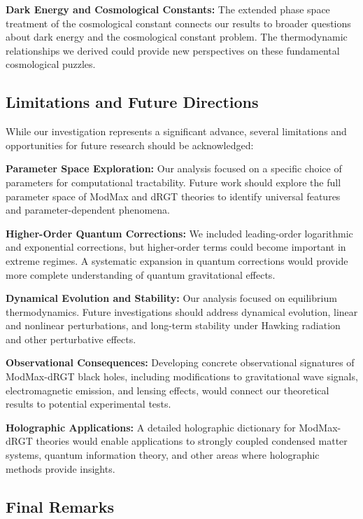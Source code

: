 \documentclass[superscriptaddress, prd, aps,amsmath,amssymb,showpacs,showkeys, onecolumn]{revtex4-2}
\begin{document}
\textbf{Dark Energy and Cosmological Constants:} The extended phase space treatment of the cosmological constant connects our results to broader questions about dark energy and the cosmological constant problem. The thermodynamic relationships we derived could provide new perspectives on these fundamental cosmological puzzles.

\subsection{Limitations and Future Directions}

While our investigation represents a significant advance, several limitations and opportunities for future research should be acknowledged:

\textbf{Parameter Space Exploration:} Our analysis focused on a specific choice of parameters for computational tractability. Future work should explore the full parameter space of ModMax and dRGT theories to identify universal features and parameter-dependent phenomena.

\textbf{Higher-Order Quantum Corrections:} We included leading-order logarithmic and exponential corrections, but higher-order terms could become important in extreme regimes. A systematic expansion in quantum corrections would provide more complete understanding of quantum gravitational effects.

\textbf{Dynamical Evolution and Stability:} Our analysis focused on equilibrium thermodynamics. Future investigations should address dynamical evolution, linear and nonlinear perturbations, and long-term stability under Hawking radiation and other perturbative effects.

\textbf{Observational Consequences:} Developing concrete observational signatures of ModMax-dRGT black holes, including modifications to gravitational wave signals, electromagnetic emission, and lensing effects, would connect our theoretical results to potential experimental tests.

\textbf{Holographic Applications:} A detailed holographic dictionary for ModMax-dRGT theories would enable applications to strongly coupled condensed matter systems, quantum information theory, and other areas where holographic methods provide insights.

\subsection{Final Remarks}
\end{document}
